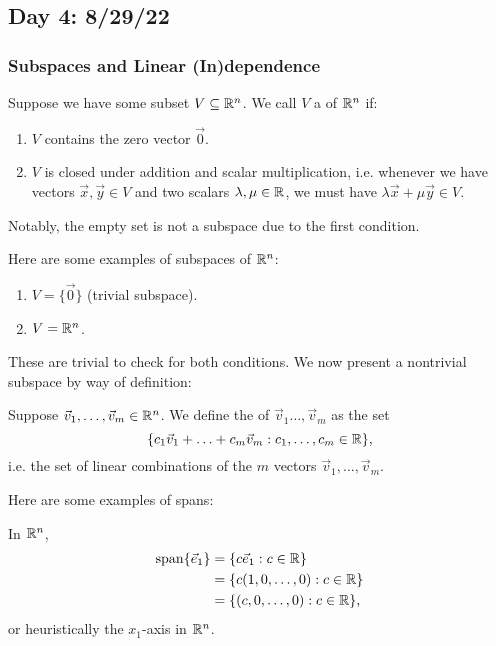 \documentclass[main.tex]{subfiles}
\begin{document}
\subsection{Day 4: 8/29/22}

\subsubsection{Subspaces and Linear (In)dependence}

\begin{definition}[Subspace]
    Suppose we have some subset $V\subseteq \mathbb R^n$. We call $V$ a  of $\mathbb R^n$ if:
    \begin{enumerate}
        \item $V$ contains the zero vector $\vec{0}$.
        \item $V$ is closed under addition and scalar multiplication, i.e. whenever we have vectors $\vec{x}, \vec{y}\in V$ and two scalars $\lambda , \mu\in \mathbb R$, we must have $\lambda \vec{x} + \mu \vec{y} \in V$.
    \end{enumerate}
\end{definition}
Notably, the empty set is not a subspace due to the first condition.

\begin{example}
    Here are some examples of subspaces of $\mathbb R^n$:
    \begin{enumerate}
        \item $V = \{\vec{0}\}$ (trivial subspace).
        \item $V = \mathbb R^n$.
    \end{enumerate}
\end{example}

These are trivial to check for both conditions. We now present a nontrivial subspace by way of definition:

\begin{definition}[Span]
    Suppose $\vec{v}_1, \ldots , \vec{v}_m\in \mathbb R^n$. We define the  of $\vec{v}_1 \ldots , \vec{v}_m$ as the set
    \[\{c_1\vec{v}_1 + \ldots + c_m\vec{v}_m : c_1, \ldots , c_m \in \mathbb R\},\]
    i.e. the set of linear combinations of the $m$ vectors $\vec{v}_1, \ldots , \vec{v}_m$.
\end{definition}

Here are some examples of spans:
\begin{example}
    In $\mathbb R^n$,
    \begin{align*}
        \operatorname{span}\{\vec{e}_1\} &= \{c\vec{e}_1 : c\in \mathbb R\} \\
        &= \{c(1, 0, \ldots , 0) : c\in \mathbb R\} \\
        &= \{(c, 0, \ldots , 0) : c \in \mathbb R\},
    \end{align*}
    or heuristically the $x_1$-axis in $\mathbb R^n$.
\end{example}
\end{document}
